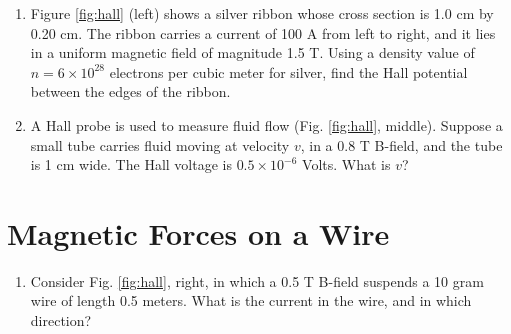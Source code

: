 \documentclass{article}
\begin{document}
\begin{enumerate}
\item Figure \ref{fig:hall} (left) shows a silver ribbon whose cross section is 1.0 cm by 0.20 cm. The ribbon carries a current of 100 A from left to right, and it lies in a uniform magnetic field of magnitude 1.5 T. Using a density value of $n = 6 \times 10^{28}$ electrons per cubic meter for silver, find the Hall potential between the edges of the ribbon. \\ \vspace{2cm}
\item A Hall probe is used to measure fluid flow (Fig. \ref{fig:hall}, middle).  Suppose a small tube carries fluid moving at velocity $v$, in a 0.8 T B-field, and the tube is 1 cm wide.  The Hall voltage is $0.5 \times 10^{-6}$ Volts.  What is $v$? \\ \vspace{1cm}
\end{enumerate}

\section{Magnetic Forces on a Wire}

\begin{enumerate}
\item Consider Fig. \ref{fig:hall}, right, in which a 0.5 T B-field suspends a 10 gram wire of length 0.5 meters.  What is the current in the wire, and in which direction?
\end{enumerate}
\end{document}
